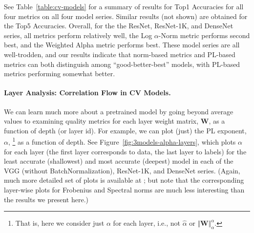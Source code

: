 See Table~\ref{table:cv-models} for a summary of results for Top1 Accuracies for all four metrics on all four model series.
Similar results (not shown) are obtained for the Top5 Accuracies.
Overall, for the the ResNet, ResNet-1K, and DenseNet series, all metrics perform relatively well, the Log $\alpha$-Norm metric performs second best, and the Weighted Alpha metric performs best. 
These model series are all well-trodden, and our results indicate that norm-based metrics and PL-based metrics can both distinguish among ``good-better-best'' models, with PL-based metrics performing somewhat better. 


\paragraph{Layer Analysis: Correlation Flow in CV Models.}

We can learn much more about a pretrained model by going beyond average values to examining quality metrics for each layer weight matrix, $\mathbf{W}$, as a function of depth (or layer id).  %
For example, we can 
plot (just) the PL exponent, $\alpha$,%
\footnote{That is, here we consider just $\alpha$ for each layer, i.e., not $\hat{\alpha}$ or $\Vert\mathbf{W}\Vert^{\alpha}_{\alpha}$.} 
as a function of depth.
%
See Figure~\ref{fig:3models-alpha-layers}, which plots $\alpha$ for each layer (the first layer corresponds to data, the last layer to labels) for the least accurate (shallowest) and most accurate (deepest) model in each of the VGG (without BatchNormalization), ResNet-1K, and DenseNet series.
(Again, much more detailed set of plots is available at \cite{XXX-WEB-LINK}; but note that the corresponding layer-wise plots for Frobenius and Spectral norms are much less interesting than the results we present here.)

